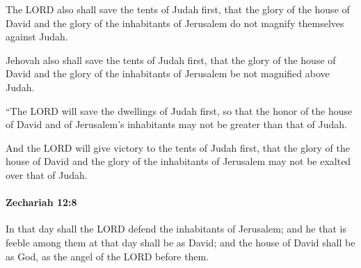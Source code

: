 			The LORD also shall save the tents of Judah first, that the glory of the house of David and the glory of the inhabitants of Jerusalem do not magnify themselves against Judah.

			\begin{versebox}
					\item[BHS] 
					\item[LXX] 
					\item[ASV] Jehovah also shall save the tents of Judah first, that the glory of the house of David and the glory of the inhabitants of Jerusalem be not magnified above Judah.
					\item[NIV] “The LORD will save the dwellings of Judah first, so that the honor of the house of David and of Jerusalem’s inhabitants may not be greater than that of Judah.
					\item[NRSV] And the LORD will give victory to the tents of Judah first, that the glory of the house of David and the glory of the inhabitants of Jerusalem may not be exalted over that of Judah.
			\end{versebox}

		\paragraph{Zechariah 12:8} %
			\label{ZECHARIAH-12-8}

			In that day shall the LORD defend the inhabitants of Jerusalem; and he that is feeble among them at that day shall be as David; and the house of David shall be as God, as the angel of the LORD before them.

